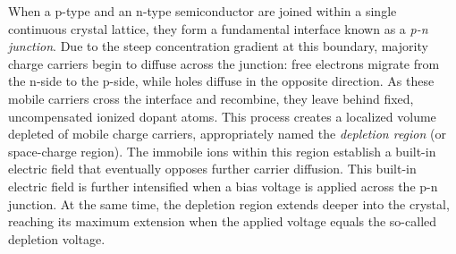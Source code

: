 When a p-type and an n-type semiconductor are joined within a single continuous crystal lattice, they form a fundamental interface known as a \textit{p-n junction}. Due to the steep concentration gradient at this boundary, majority charge carriers begin to diffuse across the junction: free electrons migrate from the n-side to the p-side, while holes diffuse in the opposite direction. As these mobile carriers cross the interface and recombine, they leave behind fixed, uncompensated ionized dopant atoms.
This process creates a localized volume depleted of mobile charge carriers, appropriately named the \textit{depletion region} (or space-charge region). The immobile ions within this region establish a built-in electric field that eventually opposes further carrier diffusion. This built-in electric field is further intensified when a bias voltage is applied across the p-n junction. At the same time, the depletion region extends deeper into the crystal, reaching its maximum extension when the applied voltage equals the so-called depletion voltage.

